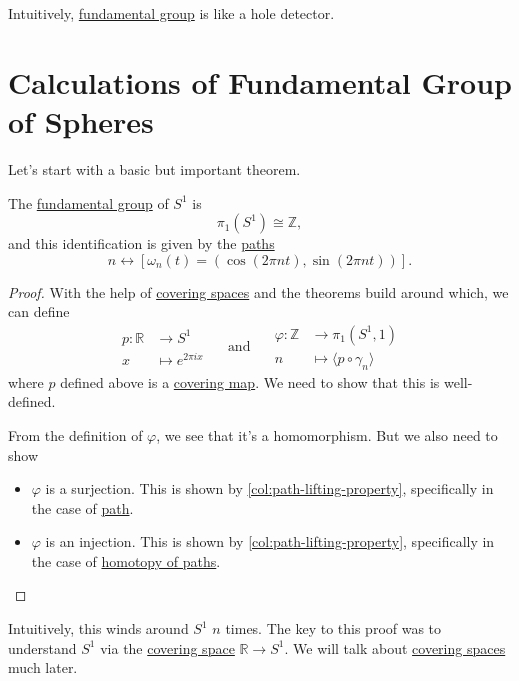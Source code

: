 \begin{prev}
	Intuitively, \hyperref[def:fundamental-group]{fundamental group} is like a hole detector.
\end{prev}

\section{Calculations of Fundamental Group of Spheres}
Let's start with a basic but important theorem.
\begin{theorem}
	The \hyperref[def:fundamental-group]{fundamental group} of \(S^1\) is
	\[
		\pi _1(S^1)\cong \mathbb{Z},
	\]
	and this identification is given by the \hyperref[def:path]{paths}
	\[
		n \leftrightarrow [\omega_{n}(t) = (\cos (2\pi nt), \sin (2\pi nt))].
	\]
\end{theorem}
\begin{proof}
	With the help of \hyperref[def:covering-space]{covering spaces} and the theorems build around which, we can define
	\[
		\begin{split}
			p \colon \mathbb{R} & \to S^1                \\
			x                   & \mapsto e^{2 \pi  i x}
		\end{split}\quad \text{ and }\quad\begin{split}
			\varphi \colon \mathbb{Z} & \to \pi _1(S^1, 1)                       \\
			n                         & \mapsto \langle p\circ \gamma _n \rangle
		\end{split}
	\]
	where \(p\) defined above is a \hyperref[def:covering-map]{covering map}. We need to show that this is well-defined.

	From the definition of \(\varphi \), we see that it's a homomorphism. But we also need to show
	\begin{itemize}
		\item \(\varphi \) is a surjection. This is shown by \autoref{col:path-lifting-property}, specifically in the case of \hyperref[def:path]{path}.
		\item \(\varphi \) is an injection. This is shown by \autoref{col:path-lifting-property}, specifically in the case of \hyperref[def:homotopy-path]{homotopy of paths}.
	\end{itemize}
\end{proof}

\begin{remark}
	Intuitively, this winds around \(S^1\) \(n\) times. The key to this proof was to understand \(S^1\) via the \hyperref[def:covering-space]{covering space} \(\mathbb{R} \to S^1\). We will talk about \hyperref[def:covering-space]{covering spaces} much later.
\end{remark}


